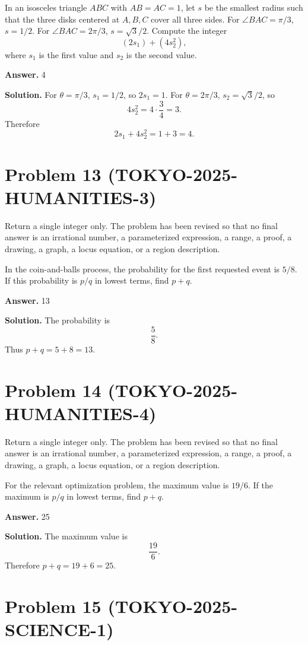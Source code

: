 \documentclass[11pt]{article}
\begin{document}
In an isosceles triangle \(ABC\) with \(AB=AC=1\), let \(s\) be the smallest
radius such that the three disks centered at \(A,B,C\) cover all three sides.
For \(\angle BAC=\pi/3\), \(s=1/2\). For \(\angle BAC=2\pi/3\), \(s=\sqrt3/2\).
Compute the integer
\[
(2s_1)+(4s_2^2),
\]
where \(s_1\) is the first value and \(s_2\) is the second value.


\textbf{Answer.} 4


\textbf{Solution.}
For \(\theta=\pi/3\), \(s_1=1/2\), so \(2s_1=1\). For
\(\theta=2\pi/3\), \(s_2=\sqrt3/2\), so
\[
4s_2^2=4\cdot\frac34=3.
\]
Therefore
\[
2s_1+4s_2^2=1+3=4.
\]


\section*{Problem 13 (TOKYO-2025-HUMANITIES-3)}

Return a single integer only. The problem has been revised so that no final answer is an irrational number, a parameterized expression, a range, a proof, a drawing, a graph, a locus equation, or a region description.

In the coin-and-balls process, the probability for the first requested event is
\(5/8\). If this probability is \(p/q\) in lowest terms, find \(p+q\).


\textbf{Answer.} 13


\textbf{Solution.}
The probability is
\[
\frac58.
\]
Thus \(p+q=5+8=13\).


\section*{Problem 14 (TOKYO-2025-HUMANITIES-4)}

Return a single integer only. The problem has been revised so that no final answer is an irrational number, a parameterized expression, a range, a proof, a drawing, a graph, a locus equation, or a region description.

For the relevant optimization problem, the maximum value is \(19/6\). If the
maximum is \(p/q\) in lowest terms, find \(p+q\).


\textbf{Answer.} 25


\textbf{Solution.}
The maximum value is
\[
\frac{19}{6}.
\]
Therefore \(p+q=19+6=25\).


\section*{Problem 15 (TOKYO-2025-SCIENCE-1)}
\end{document}
